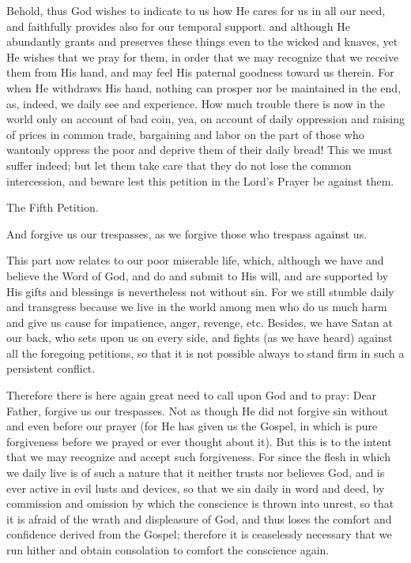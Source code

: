 Behold, thus God wishes to indicate to us how He cares for us in all
our need, and faithfully provides also for our temporal support. and
although He abundantly grants and preserves these things even to the
wicked and knaves, yet He wishes that we pray for them, in order that
we may recognize that we receive them from His hand, and may feel His
paternal goodness toward us therein. For when He withdraws His hand,
nothing can prosper nor be maintained in the end, as, indeed, we daily
see and experience. How much trouble there is now in the world only on
account of bad coin, yea, on account of daily oppression and raising of
prices in common trade, bargaining and labor on the part of those who
wantonly oppress the poor and deprive them of their daily bread! This
we must suffer indeed; but let them take care that they do not lose the
common intercession, and beware lest this petition in the Lord's Prayer
be against them.

 The Fifth Petition.

And forgive us our trespasses, as we forgive those who trespass
against us.

This part now relates to our poor miserable life, which, although we
have and believe the Word of God, and do and submit to His will, and
are supported by His gifts and blessings is nevertheless not without
sin. For we still stumble daily and transgress because we live in the
world among men who do us much harm and give us cause for impatience,
anger, revenge, etc. Besides, we have Satan at our back, who sets upon
us on every side, and fights (as we have heard) against all the
foregoing petitions, so that it is not possible always to stand firm in
such a persistent conflict.

Therefore there is here again great need to call upon God and to pray:
Dear Father, forgive us our trespasses. Not as though He did not
forgive sin without and even before our prayer (for He has given us the
Gospel, in which is pure forgiveness before we prayed or ever thought
about it). But this is to the intent that we may recognize and accept
such forgiveness. For since the flesh in which we daily live is of such
a nature that it neither trusts nor believes God, and is ever active in
evil lusts and devices, so that we sin daily in word and deed, by
commission and omission by which the conscience is thrown into unrest,
so that it is afraid of the wrath and displeasure of God, and thus
loses the comfort and confidence derived from the Gospel; therefore it
is ceaselessly necessary that we run hither and obtain consolation to
comfort the conscience again.

